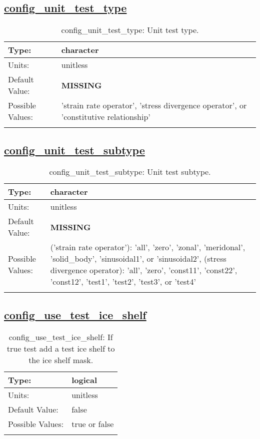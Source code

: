 \subsection[config\_unit\_test\_type]{\hyperref[sec:nm_tab_unit_test]{config\_unit\_test\_type}}
\label{subsec:nm_sec_config_unit_test_type}
\begin{center}
\begin{longtable}{| p{2.0in} || p{4.0in} |}
    \hline
    Type: & character \\
    \hline
    Units: & \si{unitless} \\
    \hline
    Default Value: & {\bf \color{red} MISSING} \\
    \hline
    Possible Values: & 'strain rate operator', 'stress divergence operator', or 'constitutive relationship' \\
    \hline
    \caption{config\_unit\_test\_type: Unit test type.}
\end{longtable}
\end{center}
\subsection[config\_unit\_test\_subtype]{\hyperref[sec:nm_tab_unit_test]{config\_unit\_test\_subtype}}
\label{subsec:nm_sec_config_unit_test_subtype}
\begin{center}
\begin{longtable}{| p{2.0in} || p{4.0in} |}
    \hline
    Type: & character \\
    \hline
    Units: & \si{unitless} \\
    \hline
    Default Value: & {\bf \color{red} MISSING} \\
    \hline
    Possible Values: & ('strain rate operator'): 'all', 'zero', 'zonal', 'meridonal', 'solid\_body', 'sinusoidal1', or 'sinusoidal2', (stress divergence operator): 'all', 'zero', 'const11', 'const22', 'const12', 'test1', 'test2', 'test3', or 'test4' \\
    \hline
    \caption{config\_unit\_test\_subtype: Unit test subtype.}
\end{longtable}
\end{center}
\subsection[config\_use\_test\_ice\_shelf]{\hyperref[sec:nm_tab_unit_test]{config\_use\_test\_ice\_shelf}}
\label{subsec:nm_sec_config_use_test_ice_shelf}
\begin{center}
\begin{longtable}{| p{2.0in} || p{4.0in} |}
    \hline
    Type: & logical \\
    \hline
    Units: & \si{unitless} \\
    \hline
    Default Value: & false \\
    \hline
    Possible Values: & true or false \\
    \hline
    \caption{config\_use\_test\_ice\_shelf: If true test add a test ice shelf to the ice shelf mask.}
\end{longtable}
\end{center}
